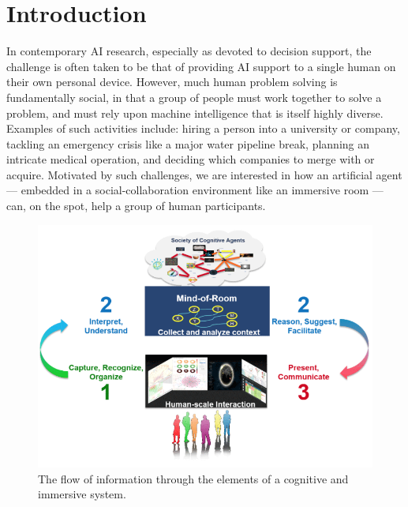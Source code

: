 \section{Introduction}

In contemporary AI research, especially as devoted to decision
support, the challenge is often taken to be that of providing AI
support to a single human on their own personal device. However, much
human problem solving is fundamentally social, in that a group of
people must work together to solve a problem, and must rely upon
machine intelligence that is itself highly diverse.  Examples of such
activities include: hiring a person into a university or company,
tackling an emergency crisis like a major water pipeline break,
planning an intricate medical operation, and deciding which companies
to merge with or acquire.  Motivated by such challenges, we are
interested in how an artificial agent --- embedded in a
social-collaboration environment like an immersive room --- can, on
the spot, help a group of human participants.

\begin{figure}
\centering
\includegraphics[width=0.5\columnwidth]{chapters/01_introduction/figures/cisl-cycle-graphic.png}
\caption{The flow of information through the elements of a cognitive and immersive system.}
\label{fig:cycle-cais}
\end{figure}

